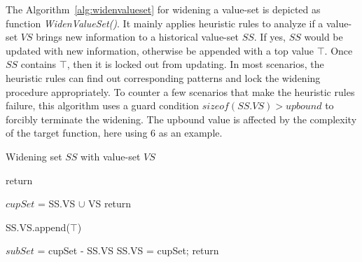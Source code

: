 The Algorithm~\ref{alg:widenvalueset} for widening a value-set is depicted as function \textit{WidenValueSet()}.
It mainly applies heuristic rules to analyze if a value-set $VS$ brings new information to a historical value-set $SS$.
If yes, $SS$ would be updated with new information, otherwise be appended with a top value $\top$.
Once $SS$ contains $\top$, then it is locked out from updating.
In most scenarios, the heuristic rules can find out corresponding patterns and lock the widening procedure appropriately.
To counter a few scenarios that make the heuristic rules failure,
this algorithm uses a guard condition $sizeof(SS.VS) > upbound$ to forcibly terminate the widening.
The upbound value is affected by the complexity of the target function, here using $6$ as an example.


\begin{algorithm}
    \caption{Widening set $SS$ with value-set $VS$}
    \footnotesize
    \begin{algorithmic}[1]
        \State return  
        \EndIf

        \State
        \State $cupSet$ = SS.VS $\cup$ VS
        \State return 
        \EndIf

        \State
         
        \State SS.VS.append($\top$)
        \EndIf

        \State
        \State $subSet$ = cupSet - SS.VS
         
        \State SS.VS = cupSet;
        \State return
        \EndIf


        \EndFunction
    \end{algorithmic}
    \label{alg:widenvalueset}
\end{algorithm}